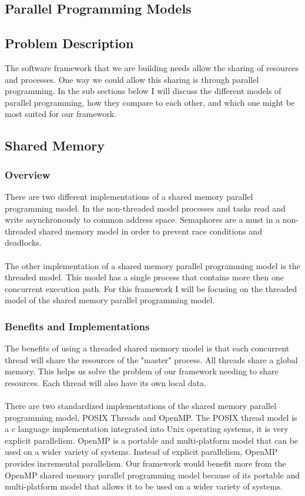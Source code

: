 \documentclass[draftclsnofoot, onecolumn, compsoc, 10pt]{IEEEtran}
\begin{document}
\subsection{Parallel Programming Models}
\subsection{Problem Description}
The software framework that we are building needs allow the sharing of resources and processes. One way we could allow this sharing is through parallel programming. In the sub sections below I will discuss the different models of parallel programming, how they compare to each other, and which one might be most suited for our framework.

\subsection{Shared Memory}
\subsubsection{Overview}
There are two different implementations of a shared memory parallel programming model. In the non-threaded model processes and tasks read and write asynchronously to common address space. Semaphores are a must in a non-threaded shared memory model in order to prevent race conditions and deadlocks. \cite{PP}
\\ \\
The other implementation of a shared memory parallel programming model is the threaded model. This model has a single process that contains more then one concurrent execution path. For this framework I will be focusing on the threaded model of the shared memory parallel programming model. \cite{PP}
\subsubsection{Benefits and Implementations}
The benefits of using a threaded shared memory model is that each concurrent thread will share the resources of the "master" process. All threads share a global memory. This helps us solve the problem of our framework needing to share resources. Each thread will also have its own local data. \cite{PP}
\\ \\
There are two standardized implementations of the shared memory parallel programming model, POSIX Threads and OpenMP. The POSIX thread model is a c language implementation integrated into Unix operating systems, it is very explicit parallelism. OpenMP is a portable and multi-platform model that can be used on a wider variety of systems. Instead of explicit parallelism, OpenMP provides incremental parallelism. Our framework would benefit more from the OpenMP shared memory parallel programming model because of its portable and multi-platform model that allows it to be used on a wider variety of systems. \cite{PP}
\end{document}
